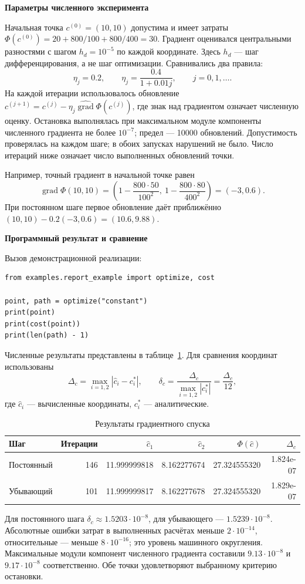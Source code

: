 \documentclass[12pt,a4paper]{article}
\newcommand{\taskhead}[1]{\par\textbf{#1}\par}
\begin{document}
\taskhead{Параметры численного эксперимента}
Начальная точка $c^{(0)}=(10,10)$ допустима и имеет затраты
$\Phi(c^{(0)})=20+800/100+800/400=30$.
Градиент оценивался центральными разностями с шагом $h_d=10^{-5}$
по каждой координате. Здесь $h_d$ --- шаг дифференцирования,
а не шаг оптимизации. Сравнивались два правила:
\[
\eta_j=0.2,\qquad \eta_j=\frac{0.4}{1+0.01j},\qquad j=0,1,\ldots.
\]
На каждой итерации использовалось обновление
$c^{(j+1)}=c^{(j)}-\eta_j\widehat{\operatorname{grad}}\Phi(c^{(j)})$,
где знак над градиентом означает численную оценку.
Остановка выполнялась при максимальном модуле компоненты численного
градиента не более $10^{-7}$; предел --- 10000 обновлений.
Допустимость проверялась на каждом шаге; в обоих запусках нарушений не было.
Число итераций ниже означает число выполненных обновлений точки.

Например, точный градиент в начальной точке равен
\[
\operatorname{grad}\Phi(10,10)
=\left(1-\frac{800\cdot50}{100^2},\
1-\frac{800\cdot80}{400^2}\right)=(-3,0.6).
\]
При постоянном шаге первое обновление даёт приближённо
$(10,10)-0.2(-3,0.6)=(10.6,9.88)$.

\taskhead{Программный результат и сравнение}
Вызов демонстрационной реализации:
\begin{lstlisting}[style=commands]
from examples.report_example import optimize, cost

point, path = optimize("constant")
print(point)
print(cost(point))
print(len(path) - 1)
\end{lstlisting}
Численные результаты представлены в таблице~\ref{tab:optimization}.
Для сравнения координат использованы
\[
\Delta_c=\max_{i=1,2}|\widehat c_i-c_i^*|,\qquad
\delta_c=\frac{\Delta_c}{\max_{i=1,2}|c_i^*|}=\frac{\Delta_c}{12},
\]
где $\widehat c_i$ --- вычисленные координаты, $c_i^*$ --- аналитические.
\begin{table}[htbp]
\centering\small
\caption{Результаты градиентного спуска}
\label{tab:optimization}
\begin{tabular}{|l|r|r|r|r|r|}\hline
Шаг & Итерации & $\widehat c_1$ & $\widehat c_2$ & $\Phi(\widehat c)$ & $\Delta_c$\\\hline
Постоянный & 146 & 11.999999818 & 8.162277674 & 27.324555320 & 1.824e-07 \\
Убывающий & 101 & 11.999999817 & 8.162277678 & 27.324555320 & 1.829e-07 \\
\hline\end{tabular}
\end{table}
Для постоянного шага $\delta_c\approx1.5203\cdot10^{-8}$,
для убывающего --- $1.5239\cdot10^{-8}$.
Абсолютные ошибки затрат в выполненных расчётах меньше $2\cdot10^{-14}$,
относительные --- меньше $8\cdot10^{-16}$; это уровень машинного округления.
Максимальные модули компонент численного градиента составили
$9.13\cdot10^{-8}$ и $9.17\cdot10^{-8}$ соответственно.
Обе точки удовлетворяют выбранному критерию остановки.
\end{document}

